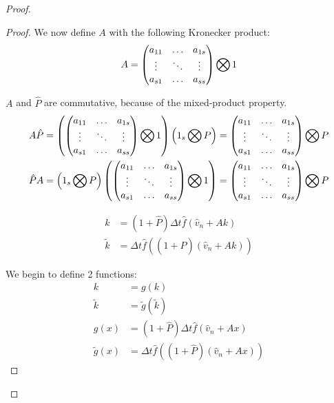 \begin{proof}
\begin{proof}
We now define $A$ with the following Kronecker product:
\begin{equation}
A=\begin{pmatrix}
    a_{11}	&\ldots	&a_{1s}\\
    \vdots	&\ddots	&\vdots\\
    a_{s1}	&\ldots	&a_{ss}\\
  \end{pmatrix} \bigotimes 1
\end{equation}

$A$ and $\hat{P}$ are commutative, because of the mixed-product property.
\begin{align}
A\hat{P}&=\left(\begin{pmatrix}
    a_{11}	&\ldots	&a_{1s}\\
    \vdots	&\ddots	&\vdots\\
    a_{s1}	&\ldots	&a_{ss}\\
  \end{pmatrix} \bigotimes 1 \right)
  \left(1_{s}\bigotimes P\right)=
	\begin{pmatrix}
    a_{11}	&\ldots	&a_{1s}\\
    \vdots	&\ddots	&\vdots\\
    a_{s1}	&\ldots	&a_{ss}\\
    \end{pmatrix}\bigotimes P\\
    \hat{P}A&=
  \left(1_{s}\bigotimes P\right)
	\left(\begin{pmatrix}
    a_{11}	&\ldots	&a_{1s}\\
    \vdots	&\ddots	&\vdots\\
    a_{s1}	&\ldots	&a_{ss}\\
  \end{pmatrix} \bigotimes 1 \right)=
	\begin{pmatrix}
    a_{11}	&\ldots	&a_{1s}\\
    \vdots	&\ddots	&\vdots\\
    a_{s1}	&\ldots	&a_{ss}\\
    \end{pmatrix}\bigotimes P
\end{align}

\begin{align}
k&=(1+\hat{P})\Delta t\hat{f}(\hat{v}_{n}+Ak)\\
\tilde{k}&=\Delta t \hat{f}((1+\hat{P})(\hat{v}_{n}+Ak))
\end{align}

We begin to define 2 functions:
\begin{align}
k&=g(k)\\
\tilde{k}&=\tilde{g}(\tilde{k})\\
g(x)&=(1+\hat{P})\Delta t \hat{f}(\hat{v}_{n}+Ax)\\
\tilde{g}(x)&=\Delta t \hat{f}((1+\hat{P})(\hat{v}_{n}+Ax))
\end{align}


\end{proof}
\end{proof}
